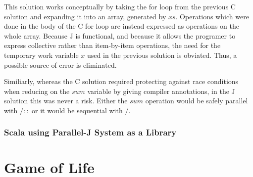 This solution works conceptually by taking the for loop from the previous C solution 
and expanding it into an array, generated by $xs$.
Operations which were done in the body of the C for loop 
are instead expressed as operations on the whole array. 
Because J is functional, and 
because it allows the programer to express collective rather than item-by-item operations, 
the need for the temporary work variable $x$ used in the previous solution is obviated. 
Thus, a possible source of error is eliminated.

Similiarly, whereas the C solution required 
protecting against race conditions when reducing on the $sum$ variable
by giving compiler annotations, 
in the J solution this was never a risk.
Either the $sum$ operation would be safely parallel with $/::$ or 
it would be sequential with $/$.

\subsubsection{Scala using Parallel-J System as a Library}




\section{Game of Life}
